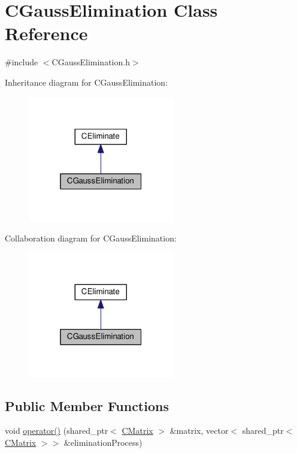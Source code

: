 \hypertarget{classCGaussElimination}{}\section{C\+Gauss\+Elimination Class Reference}
\label{classCGaussElimination}


{\ttfamily \#include $<$C\+Gauss\+Elimination.\+h$>$}



Inheritance diagram for C\+Gauss\+Elimination\+:\nopagebreak
\begin{figure}[H]
\begin{center}
\leavevmode
\includegraphics[width=181pt]{classCGaussElimination__inherit__graph}
\end{center}
\end{figure}


Collaboration diagram for C\+Gauss\+Elimination\+:\nopagebreak
\begin{figure}[H]
\begin{center}
\leavevmode
\includegraphics[width=181pt]{classCGaussElimination__coll__graph}
\end{center}
\end{figure}
\subsection*{Public Member Functions}
\begin{DoxyCompactItemize}
\item 
void \hyperlink{classCGaussElimination_af835c42ac9eb2509953a03f1e68aac43}{operator()} (shared\+\_\+ptr$<$ \hyperlink{classCMatrix}{C\+Matrix} $>$ \&matrix, vector$<$ shared\+\_\+ptr$<$ \hyperlink{classCMatrix}{C\+Matrix} $>$$>$ \&elimination\+Process)
\end{DoxyCompactItemize}
